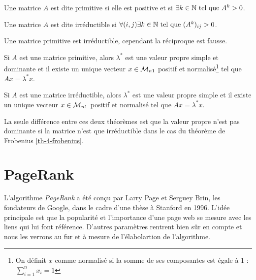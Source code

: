 	\begin{definition}
		\label{def-4-matPrimitive}
		Une matrice $A$ est dite primitive si elle est positive et si $\exists k \in \mathbb{N} \text{ tel que } A^k > 0$.
	\end{definition}

	\begin{definition}
		\label{def-4-matIrreductible}
		Une matrice $A$ est dite irréductible si $\forall(i,j) \exists k \in \mathbb{N} \text{ tel que } (A^k)_{ij} > 0$.
	\end{definition}
		
	Une matrice primitive est irréductible, cependant la réciproque est fausse. 

	\begin{theoreme}
		\label{th-4-perron}
		Si $A$ est une matrice primitive, alors $\lambda^*$ est une valeur propre simple et dominante et il existe un unique vecteur $x \in\mathcal{M}_{n1}$ positif et normalisé\footnote{On définit $x$ comme normalisé si la somme de ses composantes est égale à 1 : $\sum_{i=1}^n x_i = 1$} tel que $Ax = \lambda^*x$.
	\end{theoreme}

	\begin{theoreme}
		\label{th-4-frobenius}
		Si $A$ est une matrice irréductible, alors $\lambda^*$ est une valeur propre simple et il existe un unique vecteur $x \in\mathcal{M}_{n1}$ positif et normalisé tel que $Ax = \lambda^*x$.
	\end{theoreme}

	La seule différence entre ces deux théorèmes est que la valeur propre n'est pas dominante si la matrice n'est que irréductible dans le cas du théorème de Frobenius \eqref{th-4-frobenius}.


\section{PageRank}
\label{ch-4-PageRank}

		    
		L'algorithme \emph{PageRank} a été conçu par Larry Page et Serguey Brin, les fondateurs de Google, dans le cadre d'une thèse à Stanford en 1996.
		L'idée principale est que la popularité et l'importance d'une page web se mesure avec les liens qui lui font référence.
		D'autres paramètres rentrent bien sûr en compte et nous les verrons au fur et à mesure de l'élabolartion de l'algorithme.

